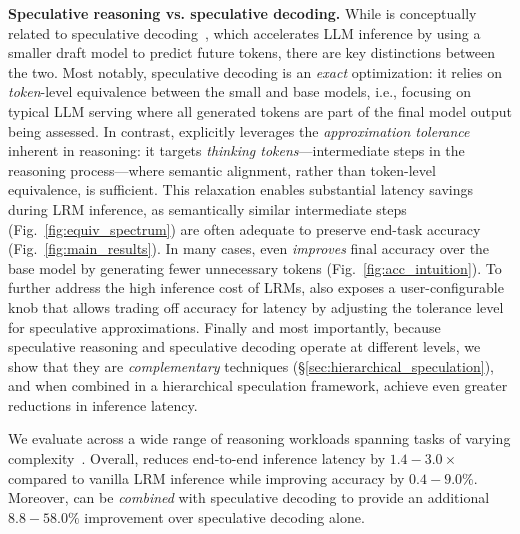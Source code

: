 \textbf{Speculative reasoning vs. speculative decoding.} While \name{} is conceptually related to speculative decoding~\citep{spec_decoding}, which accelerates LLM inference by using a smaller draft model to predict future tokens, there are key distinctions between the two. Most notably, speculative decoding is an \emph{exact} optimization: it relies on {\em token}-level equivalence between the small and base models, i.e., focusing on typical LLM serving where all generated tokens are part of the final model output being assessed. In contrast, \name{} explicitly leverages the {\em approximation tolerance} inherent in reasoning: it targets {\em thinking tokens}---intermediate steps in the reasoning process---where semantic alignment, rather than token-level equivalence, is sufficient.
This relaxation enables substantial latency savings during LRM inference, as semantically similar intermediate steps (Fig.~\ref{fig:equiv_spectrum}) are often adequate to preserve end-task accuracy (Fig.~\ref{fig:main_results}).
In many cases, \name{} even \emph{improves} final accuracy over the base model by generating fewer unnecessary tokens (Fig.~\ref{fig:acc_intuition}).
To further address the high inference cost of LRMs, \name{} also exposes a user-configurable knob that allows trading off accuracy for latency by adjusting the tolerance level for speculative approximations.
Finally and most importantly, because speculative reasoning and speculative decoding operate at different levels, we show that they are \emph{complementary} techniques (\S\ref{sec:hierarchical_speculation}), and when combined in a hierarchical speculation framework, achieve even greater reductions in inference latency.



We evaluate \name{} across a wide range of reasoning workloads spanning tasks of varying complexity~\citep{aime,math500,gpqa}. Overall, \name{} reduces end-to-end inference latency by $1.4-3.0\times$ compared to vanilla LRM inference while improving accuracy by $0.4-9.0\%$. Moreover, \name{} can be {\em combined} with speculative decoding to provide an additional $8.8-58.0\%$ improvement over speculative decoding alone.





    





